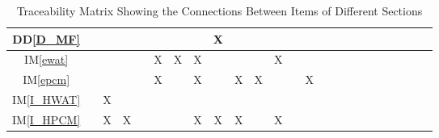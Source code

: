 \documentclass[12pt]{article}
\newcommand{\ddref}[1]{DD\ref{#1}}
\newcommand{\iref}[1]{IM\ref{#1}}
\begin{document}
\begin{table}[h!]
\begin{tabular}{|c|c|c|c|c|c|c|c|c|c|c|c|c|c|c|c|c|c|c|c|c|c|c|c|}
        \ddref{D_MF}     &              &              &              &           &             &                  &                 & X             &              &             &             &               &               \\ \hline
        \iref{ewat}      &              &              &              &           & X           & X                & X               &               &              &             & X           &               &               \\ \hline
        \iref{epcm}      &              &              &              &           & X           &                  & X               &               & X            & X           &             &               & X             \\ \hline
        \iref{I_HWAT}    &              & X            &              &           &             &                  &                 &               &              &             &             &               &               \\ \hline
        \iref{I_HPCM}    &              & X            & X            &           &             &                  & X               & X             & X            &             & X           &               &               \\
        \hline
    \end{tabular}
    \caption{Traceability Matrix Showing the Connections Between Items of Different Sections}
    \label{Table:trace}
\end{table}
\end{document}
